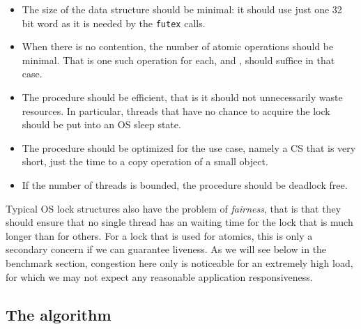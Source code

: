 \begin{itemize}
\item The size of the data structure should be minimal: it should
use just one 32 bit word as it is needed by the \texttt{futex}
calls.\itemadjust

\item When there is no contention, the number of atomic operations should
be minimal. That is one such operation for each,  and
, should suffice in that case.\itemadjust

\item The procedure should be efficient, that is it should not
unnecessarily waste resources. In particular, threads that have no
chance to acquire the lock should be put into an OS sleep
state.\itemadjust

\item The procedure should be optimized for the use case, namely a CS that
  is very short, just the time to a copy operation of a small object.

\item If the number of threads is bounded, the procedure should be
deadlock free.\itemadjust
\end{itemize}

Typical OS lock structures also have the problem of \emph{fairness}, that
is that they should ensure that no single thread has an waiting time for
the lock that is much longer than for others. For a lock that is used for
atomics, this is only a secondary concern if we can guarantee liveness. As
we will see below in the benchmark section, congestion here only is
noticeable for an extremely high load, for which we may not expect any
reasonable application responsiveness.

\subsection{The algorithm}
\label{sec-3-1}


